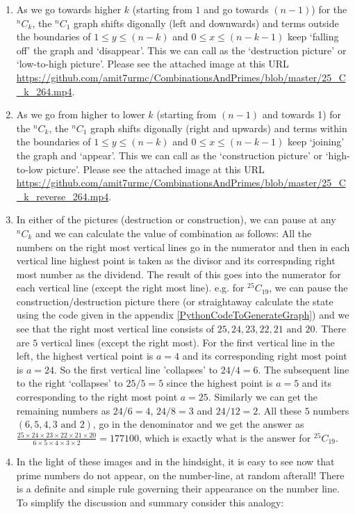 \documentclass[12pt, twoside]{article}
\newcommand*{\Combination}[2]{{}^{#1}C_{#2}}%
\begin{document}
\begin{enumerate}
	\item As we go towards higher $k$ (starting from $1$ and go towards $(n-1)$) for the $\Combination{n}{k}$, the $\Combination{n}{1}$ graph shifts digonally (left and downwards) and terms outside the boundaries of $ 1 \leq y \leq (n-k)$ and $0 \leq x \leq (n-k-1)$ keep `falling off' the graph and `disappear'. This we can call as the `destruction picture' or `low-to-high picture'. Please see the attached image at this URL \url{https://github.com/amit7urmc/CombinationsAndPrimes/blob/master/25_C_k_264.mp4}.
	\item As we go from higher to lower $k$ (starting from $(n-1)$ and towards 1) for the $\Combination{n}{k}$, the $\Combination{n}{1}$ graph shifts digonally (right and upwards) and terms within the boundaries of $ 1 \leq y \leq (n-k)$ and $0 \leq x \leq (n-k-1)$ keep `joining' the graph and `appear'. This we can call as the `construction picture' or `high-to-low picture'. Please see the attached image at this URL \url{https://github.com/amit7urmc/CombinationsAndPrimes/blob/master/25_C_k_reverse_264.mp4}.
	\item In either of the pictures (destruction or construction), we can pause at any $\Combination{n}{k}$ and we can calculate the value of combination as follows: All the numbers on the right most vertical lines go in the numerator and then in each vertical line highest point is taken as the divisor and its correspnding right most number as the dividend. The result of this goes into the numerator for each vertical line (except the right most line). e.g. for $\Combination{25}{19}$, we can pause the construction/destruction picture there (or straightaway calculate the state using the code given in the appendix \ref{PythonCodeToGenerateGraph}) and we see that the right most vertical line consists of $25, 24, 23, 22, 21 \text{ and } 20$. There are $5$ vertical lines (except the right most). For the first vertical line in the left, the highest vertical point is $a=4$ and its corresponding right most point is $a=24$. So the first vertical line 'collapses' to $24/4=6$. The subsequent line to the right `collapses' to $25/5=5$ since the highest point is $a=5$ and its corresponding to the right most point $a=25$. Similarly we can get the remaining numbers as $24/6=4$, $24/8=3$ and $24/12=2$. All these $5$ numbers $(6,5,4,3 \text{ and } 2)$, go in the denominator and we get the answer as $\frac{25\times24\times23\times22\times21\times20}{6\times5\times4\times3\times2}=177100$, which is exactly what is the answer for $\Combination{25}{19}$. 
	\item In the light of these images and in the hindsight, it is easy to see now that prime numbers do not appear, on the number-line, at random afterall! There is a definite and simple rule governing their appearance on the number line. To simplify the discussion and summary consider this analogy: 

\end{enumerate}
\end{document}
